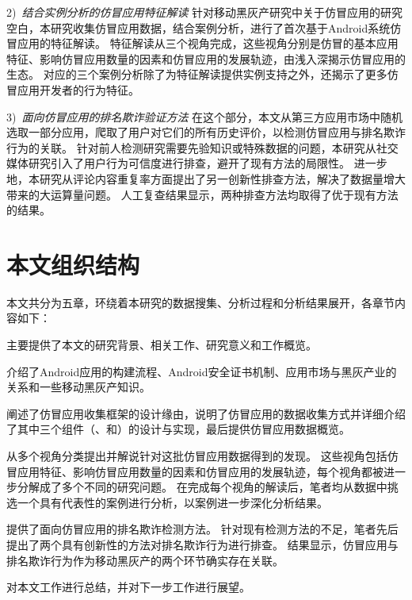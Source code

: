 2)\ \emph{结合实例分析的仿冒应用特征解读} \quad
针对移动黑灰产研究中关于仿冒应用的研究空白，本研究收集仿冒应用数据，结合案例分析，进行了首次基于Android系统仿冒应用的特征解读。
特征解读从三个视角完成，这些视角分别是仿冒的基本应用特征、影响仿冒应用数量的因素和仿冒应用的发展轨迹，由浅入深揭示仿冒应用的生态。
对应的三个案例分析除了为特征解读提供实例支持之外，还揭示了更多仿冒应用开发者的行为特征。

3)\ \emph{面向仿冒应用的排名欺诈验证方法} \quad
在这个部分，本文从第三方应用市场中随机选取一部分应用，爬取了用户对它们的所有历史评价，以检测仿冒应用与排名欺诈行为的关联。
针对前人检测研究需要先验知识或特殊数据的问题，本研究从社交媒体研究引入了用户行为可信度进行排查，避开了现有方法的局限性。
进一步地，本研究从评论内容重复率方面提出了另一创新性排查方法，解决了数据量增大带来的大运算量问题。
人工复查结果显示，两种排查方法均取得了优于现有方法的结果。


\section{本文组织结构}
本文共分为五章，环绕着本研究的数据搜集、分析过程和分析结果展开，各章节内容如下：

 主要提供了本文的研究背景、相关工作、研究意义和工作概览。

 介绍了Android应用的构建流程、Android安全证书机制、应用市场与黑灰产业的关系和一些移动黑灰产知识。

 阐述了仿冒应用收集框架\mytool 的设计缘由，说明了仿冒应用的数据收集方式并详细介绍了其中三个组件（\componentA、\componentB 和\componentC）的设计与实现，最后提供仿冒应用数据概览。

 从多个视角分类提出并解说针对这批仿冒应用数据得到的发现。
这些视角包括仿冒应用特征、影响仿冒应用数量的因素和仿冒应用的发展轨迹，每个视角都被进一步分解成了多个不同的研究问题。
在完成每个视角的解读后，笔者均从数据中挑选一个具有代表性的案例进行分析，以案例进一步深化分析结果。

 提供了面向仿冒应用的排名欺诈检测方法。
针对现有检测方法的不足，笔者先后提出了两个具有创新性的方法对排名欺诈行为进行排查。
结果显示，仿冒应用与排名欺诈行为作为移动黑灰产的两个环节确实存在关联。

 对本文工作进行总结，并对下一步工作进行展望。
